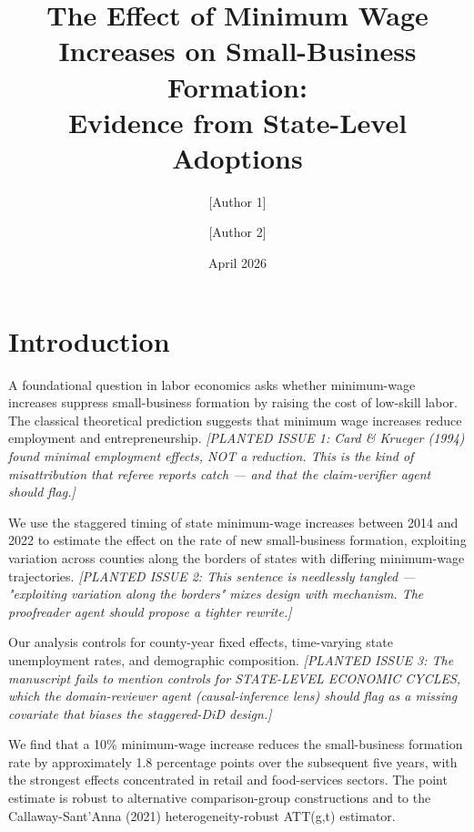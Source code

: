 \documentclass[11pt]{article}
\title{The Effect of Minimum Wage Increases on Small-Business Formation: \\
       Evidence from State-Level Adoptions}
\author{[Author 1] \and [Author 2]}
\date{April 2026}
\begin{document}
\maketitle

\section{Introduction}

A foundational question in labor economics asks whether minimum-wage increases
suppress small-business formation by raising the cost of low-skill labor. The
classical theoretical prediction \citep{Card1994} suggests that minimum wage
increases reduce employment and entrepreneurship. \emph{[PLANTED ISSUE 1: Card
\& Krueger (1994) found minimal employment effects, NOT a reduction. This is
the kind of misattribution that referee reports catch — and that the
claim-verifier agent should flag.]}

We use the staggered timing of state minimum-wage increases between 2014 and
2022 to estimate the effect on the rate of new small-business formation,
exploiting variation across counties along the borders of states with
differing minimum-wage trajectories. \emph{[PLANTED ISSUE 2: This sentence is
needlessly tangled — "exploiting variation along the borders" mixes design
with mechanism. The proofreader agent should propose a tighter rewrite.]}

Our analysis controls for county-year fixed effects, time-varying state
unemployment rates, and demographic composition. \emph{[PLANTED ISSUE 3: The
manuscript fails to mention controls for STATE-LEVEL ECONOMIC CYCLES, which
the domain-reviewer agent (causal-inference lens) should flag as a missing
covariate that biases the staggered-DiD design.]}

We find that a 10\% minimum-wage increase reduces the small-business formation
rate by approximately 1.8 percentage points over the subsequent five years,
with the strongest effects concentrated in retail and food-services sectors.
The point estimate is robust to alternative comparison-group constructions
and to the Callaway-Sant'Anna (2021) heterogeneity-robust ATT(g,t) estimator.
\end{document}

